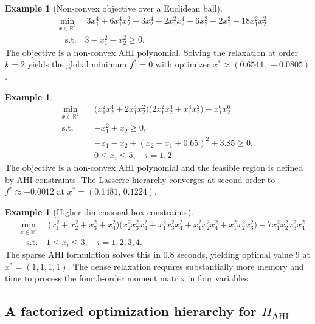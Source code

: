 \documentclass[12pt]{elsarticle}
\theoremstyle{definition}
\newtheorem{example}[theorem]{Example}
\newcommand{\AHI}{\mathrm{AHI}}
\newcommand{\PiAHI}{\Pi_{\AHI}}
\begin{document}
\begin{example}[Non-convex objective over a Euclidean ball]\label{ex:num1}
\[
\begin{aligned}
& \min_{x\in \mathbb{R}^{2}} \quad 3x_1^4 + 6x_1^4 x_2^2 + 3x_2^4 + 2x_1^2 x_2^4 + 6x_2^2 + 2x_1^2 - 18x_1^2 x_2^2\\
& \quad\text{s.t.}\quad  3 - x_1^2 - x_2^2 \geq 0 .
\end{aligned}
\]
The objective is a non-convex AHI polynomial. Solving the relaxation at order $k=2$ yields the global minimum $f^* = 0$ with optimizer $x^* \approx (0.6544,\,-0.0805)$.
\end{example}

\begin{example}\label{ex:num2}
\[
\begin{aligned}
   \min_{x\in\mathbb{R}^2} \quad& \big(x_1^2x_2^4 + 2x_1^4x_2^2\big)\big(2x_1^2x_2^4 + x_1^4x_2^2\big) - x_1^6x_2^6\\
   \text{s.t.}\quad &  - x_1^2 + x_2 \geq 0, \\
  & -x_1 - x_2 +(x_2 - x_1 + 0.65)^2 + 3.85 \geq 0,\\
  & 0\leq x_i\leq 5,\quad i=1,2 .
\end{aligned}
\]
The objective is a non-convex AHI polynomial and the feasible region is defined by AHI constraints. The Lasserre hierarchy converges at second order to $f^* \approx -0.0012$ at $x^*=(0.1481,\,0.1224)$.
\end{example}

\begin{example}[Higher-dimensional box constraints]\label{ex:num3}
\[
\begin{aligned}
& \min_{x\in \mathbb{R}^{4}}  \quad  \big(x_1^2 + x_2^2 + x_3^2 + x_4^2\big)\big(x_2^2x_3^2x_4^2 + x_1^2x_3^2x_4^2 + x_1^2x_2^2x_4^2 + x_1^2x_2^2x_3^2\big) - 7x_1^2x_2^2x_3^2x_4^2\\
& \quad\text{s.t.}\quad 1\leq x_{i}\leq 3,\quad i=1,2,3,4 .
\end{aligned}
\]
The sparse AHI formulation solves this in 0.8 seconds, yielding optimal value $9$ at $x^* = (1,1,1,1)$. The dense relaxation requires substantially more memory and time to process the fourth-order moment matrix in four variables.
\end{example}

\subsection{A factorized optimization hierarchy for \texorpdfstring{$\PiAHI$}{Pi AHI}}\label{subsec:factorized-hierarchy}
\end{document}
